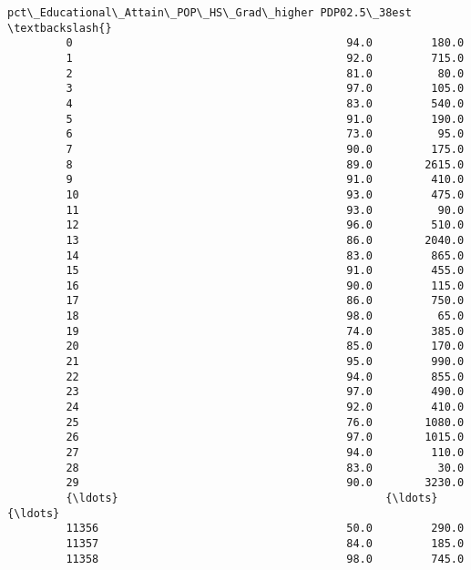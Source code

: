 \documentclass[11pt]{article}
\begin{document}
\begin{Verbatim}[commandchars=\\\{\}]
               pct\_Educational\_Attain\_POP\_HS\_Grad\_higher PDP02.5\_38est  \textbackslash{}
         0                                          94.0         180.0   
         1                                          92.0         715.0   
         2                                          81.0          80.0   
         3                                          97.0         105.0   
         4                                          83.0         540.0   
         5                                          91.0         190.0   
         6                                          73.0          95.0   
         7                                          90.0         175.0   
         8                                          89.0        2615.0   
         9                                          91.0         410.0   
         10                                         93.0         475.0   
         11                                         93.0          90.0   
         12                                         96.0         510.0   
         13                                         86.0        2040.0   
         14                                         83.0         865.0   
         15                                         91.0         455.0   
         16                                         90.0         115.0   
         17                                         86.0         750.0   
         18                                         98.0          65.0   
         19                                         74.0         385.0   
         20                                         85.0         170.0   
         21                                         95.0         990.0   
         22                                         94.0         855.0   
         23                                         97.0         490.0   
         24                                         92.0         410.0   
         25                                         76.0        1080.0   
         26                                         97.0        1015.0   
         27                                         94.0         110.0   
         28                                         83.0          30.0   
         29                                         90.0        3230.0   
         {\ldots}                                         {\ldots}           {\ldots}   
         11356                                      50.0         290.0   
         11357                                      84.0         185.0   
         11358                                      98.0         745.0   

\end{Verbatim}
\end{document}
